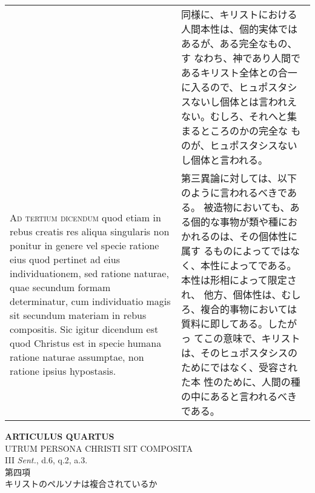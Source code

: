 \documentclass[10pt]{jsarticle} %
\begin{document}
\begin{longtable}{p{21em}p{21em}}
&

同様に、キリストにおける人間本性は、個的実体ではあるが、ある完全なもの、す
 なわち、神であり人間であるキリスト全体との合一に入るので、ヒュポスタシ
 スないし個体とは言われえない。むしろ、それへと集まるところのかの完全な
 ものが、ヒュポスタシスないし個体と言われる。

\\



{\scshape Ad tertium dicendum} quod etiam in rebus creatis res aliqua singularis
non ponitur in genere vel specie ratione eius quod pertinet ad eius
individuationem, sed ratione naturae, quae secundum formam determinatur,
cum individuatio magis sit secundum materiam in rebus compositis. Sic
igitur dicendum est quod Christus est in specie humana ratione naturae
assumptae, non ratione ipsius hypostasis.

&


第三異論に対しては、以下のように言われるべきである。
被造物においても、ある個的な事物が類や種におかれるのは、その個体性に属す
 るものによってではなく、本性によってである。本性は形相によって限定され、
 他方、個体性は、むしろ、複合的事物においては質料に即してある。したがっ
 てこの意味で、キリストは、そのヒュポスタシスのためにではなく、受容され
 た本
 性のために、人間の種の中にあると言われるべきである。


\end{longtable}
\newpage







\begin{center}
 {\Large {\bf ARTICULUS QUARTUS}}\\
 {\large UTRUM PERSONA CHRISTI SIT COMPOSITA}\\
 {\footnotesize III {\itshape Sent.}, d.6, q.2, a.3.}\\
 {\Large 第四項\\キリストのペルソナは複合されているか}
\end{center}
\end{document}
